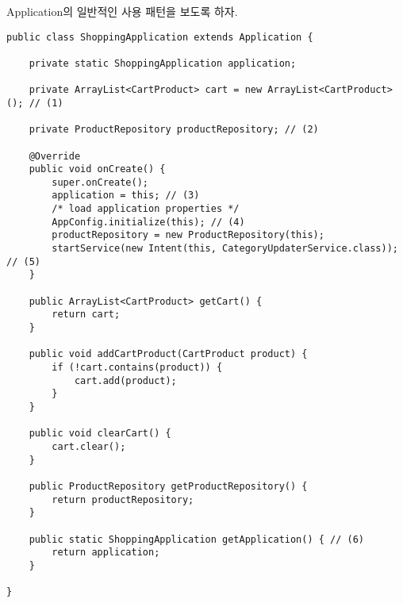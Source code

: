 Application의 일반적인 사용 패턴을 보도록 하자.
\begin{lstlisting}[frame=single, caption=Application 샘플, label=application] 
public class ShoppingApplication extends Application {

	private static ShoppingApplication application;
	
	private ArrayList<CartProduct> cart = new ArrayList<CartProduct>(); // (1)
	
	private ProductRepository productRepository; // (2)
	
	@Override
	public void onCreate() {
		super.onCreate();
		application = this; // (3)
		/* load application properties */
		AppConfig.initialize(this); // (4)
		productRepository = new ProductRepository(this);
		startService(new Intent(this, CategoryUpdaterService.class)); // (5)
	}
	
	public ArrayList<CartProduct> getCart() {
		return cart;
	}
	
	public void addCartProduct(CartProduct product) {
		if (!cart.contains(product)) {
			cart.add(product);
		}
	}
	
	public void clearCart() {
		cart.clear();
	}
	
	public ProductRepository getProductRepository() {
		return productRepository;
	}
	
	public static ShoppingApplication getApplication() { // (6)
		return application;
	}
	
}
\end{lstlisting}
